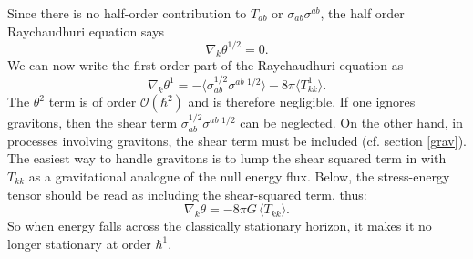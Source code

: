 \documentclass[12pt]{article}
\begin{document}
Since there is no half-order contribution to $T_{ab}$ or $\sigma_{ab}\sigma^{ab}$, the half order Raychaudhuri equation says
\begin{equation}\label{Rayhalf}
\nabla_k \theta^{1/2} = 0.
\end{equation}
We can now write the first order part of the Raychaudhuri equation as
\begin{equation}\label{Ray1}
\nabla_k \theta^1 = - \langle \sigma_{ab}^{1/2}\sigma^{ab\phantom{i}{1/2}} \rangle - 8\pi \langle T_{kk}^{1} \rangle.
\end{equation}
The $\theta^2$ term is of order $\mathcal{O}(\hbar^{2})$ and is therefore negligible.  If one ignores gravitons, then the shear term $\sigma_{ab}^{1/2}\sigma^{ab\phantom{i}{1/2}}$ can be neglected.  On the other hand, in processes involving gravitons, the shear term must be included (cf. section \ref{grav}).  The easiest way to handle gravitons is to lump the shear squared term in with $T_{kk}$ as a gravitational analogue of the null energy flux.  Below, the stress-energy tensor should be read as including the shear-squared term, thus:
\begin{equation}\label{linRay}
\nabla_k \theta = -8\pi G\,\langle T_{kk} \rangle.
\end{equation}
So when energy falls across the classically stationary horizon, it makes it no longer stationary at order $\hbar^1$.
\end{document}
